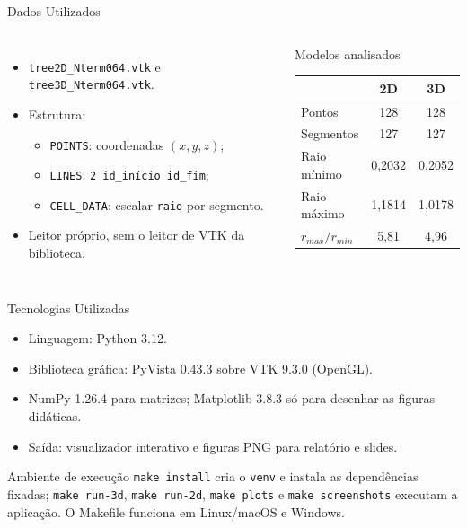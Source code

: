 \documentclass[aspectratio=169,11pt]{beamer}
\begin{document}
\begin{frame}{Dados Utilizados}
\begin{columns}
\begin{itemize}
  \item \texttt{tree2D\_Nterm064.vtk} e \texttt{tree3D\_Nterm064.vtk}.
  \item Estrutura:
  \begin{itemize}
    \item \texttt{POINTS}: coordenadas $(x,y,z)$;
    \item \texttt{LINES}: \texttt{2 id\_início id\_fim};
    \item \texttt{CELL\_DATA}: escalar \texttt{raio} por segmento.
  \end{itemize}
  \item Leitor próprio, sem o leitor de VTK da biblioteca.
\end{itemize}

\begin{block}{Modelos analisados}
\small
\begin{tabular}{lcc}
\toprule
 & \textbf{2D} & \textbf{3D}\\
\midrule
Pontos & 128 & 128\\
Segmentos & 127 & 127\\
Raio mínimo & 0,2032 & 0,2052\\
Raio máximo & 1,1814 & 1,0178\\
$r_{max}/r_{min}$ & 5,81 & 4,96\\
\bottomrule
\end{tabular}
\end{block}
\end{columns}
\end{frame}

\begin{frame}{Tecnologias Utilizadas}
\begin{itemize}
  \item Linguagem: Python 3.12.
  \item Biblioteca gráfica: PyVista 0.43.3 sobre VTK 9.3.0 (OpenGL).
  \item NumPy 1.26.4 para matrizes; Matplotlib 3.8.3 só para desenhar as figuras didáticas.
  \item Saída: visualizador interativo e figuras PNG para relatório e slides.
\end{itemize}

\vspace{0.25cm}

\begin{block}{Ambiente de execução}
\texttt{make install} cria o \texttt{venv} e instala as dependências fixadas; \texttt{make run-3d}, \texttt{make run-2d}, \texttt{make plots} e \texttt{make screenshots} executam a aplicação. O Makefile funciona em Linux/macOS e Windows.
\end{block}
\end{frame}
\end{document}
